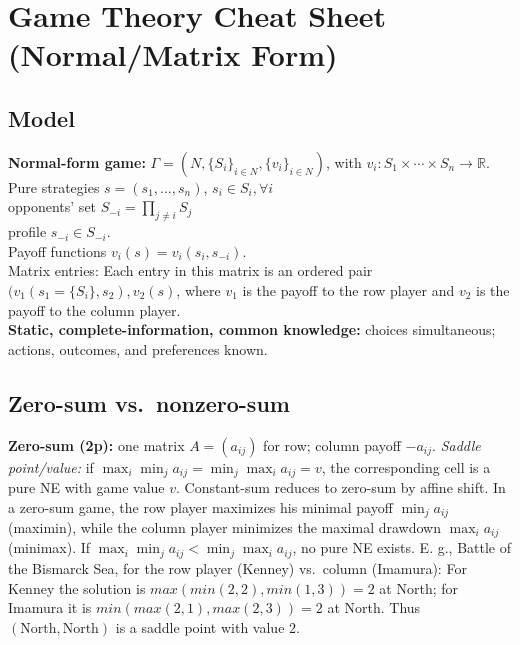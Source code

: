 \documentclass[10pt]{article}
\newcommand{\Players}{N}
\newcommand{\Sii}{S_{-i}}
\newcommand{\vi}{v_i}
\begin{document}
\newpage
\section*{Game Theory Cheat Sheet (Normal/Matrix Form)}

\subsection*{Model}
\textbf{Normal-form game:} $\Gamma=(\Players,\{S_i\}_{i\in\Players},\{\vi\}_{i\in\Players})$, with $\vi:S_1\times\cdots\times S_n\to\mathbb{R}$. \\
Pure strategies $s=(s_1,\dots,s_n)$, $s_i \in S_i, \forall i$\\
opponents’ set $\Sii=\prod_{j\neq i}S_j$ \\
profile $s_{-i}\in \Sii$.\\
Payoff functions $\vi(s)=\vi(s_i,s_{-i})$. \\
Matrix entries: Each entry in this matrix is an ordered pair $(v_1(s_1 = \{S_i\},s_2),v_2(s)$, where $v_1$ is the payoff to the row player and $v_2$ is the payoff to the column player. \\
\textbf{Static, complete-information, common knowledge:} choices simultaneous; actions, outcomes, and preferences known. %

\subsection*{Zero-sum vs.\ nonzero-sum}
\textbf{Zero-sum (2p):} one matrix $A=(a_{ij})$ for row; column payoff $-a_{ij}$. \emph{Saddle point/value:} if $\max_i\min_j a_{ij}=\min_j\max_i a_{ij}=v$, the corresponding cell is a pure NE with game value $v$. Constant-sum reduces to zero-sum by affine shift.
In a zero-sum game, the row player maximizes his minimal payoff $\min_j a_{ij}$ (maximin), while the column player minimizes the maximal drawdown $\max_i a_{ij}$ (minimax). If $\max_i\min_j a_{ij}<\min_j\max_i a_{ij}$, no pure NE exists. %
E. g., Battle of the Bismarck Sea, for the row player (Kenney) vs.\ column (Imamura):
For Kenney the solution is $max(min(2,2),min(1,3))=2$ at North; for Imamura it is $min(max(2,1),max(2,3))=2$ at North. Thus $(\text{North},\text{North})$ is a saddle point with value $2$. %
\end{document}
